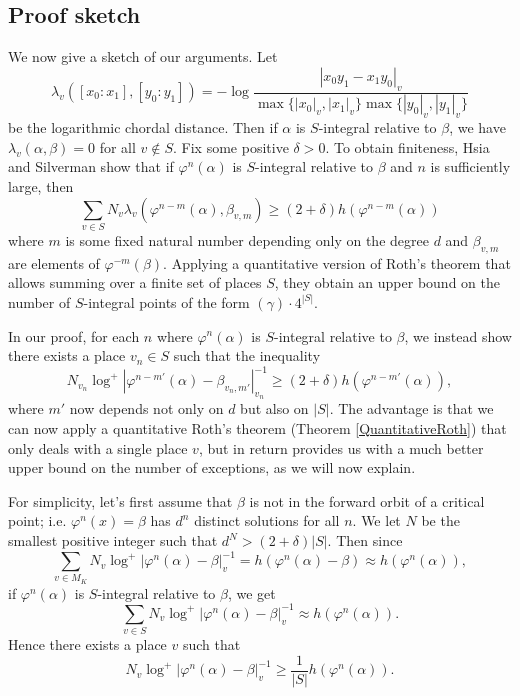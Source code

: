 \documentclass[10pt, reqno]{amsart}
\newcommand{\vphi}{\varphi}
\numberwithin{theorem}{section}
\numberwithin{equation}{section}
\numberwithin{example}{section}
\numberwithin{definition}{section}
\begin{document}
\subsection{Proof sketch}
We now give a sketch of our arguments. Let   
$$\lambda_v([x_0:x_1],[y_0:y_1]) = -\log\frac{|x_0y_1 - x_1y_0|_v}{\max\{|x_0|_v,|x_1|_v\} \max\{|y_0|_v,|y_1|_v\}}$$
be the logarithmic chordal distance. Then if $\alpha$ is $S$-integral relative to $\beta$, we have $\lambda_v(\alpha,\beta) = 0$
for all $v \not \in S$. Fix some positive $\delta > 0$. To obtain finiteness, Hsia and Silverman show that if $\vphi^n(\alpha)$ is $S$-integral relative to $\beta$ and $n$ is sufficiently large, then
$$\sum_{v \in S} N_v \lambda_v(\vphi^{n-m}(\alpha),\beta_{v,m}) \geq (2+\delta) h(\vphi^{n-m}(\alpha))$$
where $m$ is some fixed natural number depending only on the degree $d$ and $\beta_{v,m}$ are elements of $\vphi^{-m}(\beta)$. Applying a quantitative version of Roth's theorem \cite[Theorem 10]{HS11} that allows summing over a finite set of places $S$, they obtain an upper bound on the number of $S$-integral points of the form $(\gamma) \cdot 4^{|S|}$.
\par 
In our proof, for each $n$ where $\vphi^n(\alpha)$ is $S$-integral relative to $\beta$, we instead show there exists a place $v_n \in S$ such that the inequality
$$N_{v_n} \log^+|\vphi^{n-m'}(\alpha)-\beta_{v_n,m'}|^{-1}_{v_n} \geq (2+\delta)h(\vphi^{n-m'}(\alpha)),$$
where $m'$ now depends not only on $d$ but also on $|S|$. The advantage is that we can now apply a quantitative Roth's theorem (Theorem \ref{QuantitativeRoth}) that only deals with a single place $v$, but in return provides us with a much better upper bound on the number of exceptions, as we will now explain.  
\par 
For simplicity, let's first assume that $\beta$ is not in the forward orbit of a critical point; i.e. $\vphi^n(x) = \beta$ has $d^n$ distinct solutions for all $n$. We let $N$ be the smallest positive integer such that $d^N > (2+\delta)|S|$. Then since 
$$\sum_{v \in M_K} N_v \log^+|\vphi^n(\alpha) - \beta|^{-1}_v = h(\vphi^n(\alpha) - \beta) \approx h(\vphi^n(\alpha)),$$
if $\vphi^n(\alpha)$ is $S$-integral relative to $\beta$, we get
$$\sum_{v \in S} N_v \log^+|\vphi^n(\alpha) -\beta|^{-1}_v \approx h(\vphi^n(\alpha)).$$
Hence there exists a place $v$ such that
\begin{equation} \label{eq: IntroInequality1}
N_v \log^+|\vphi^n(\alpha) - \beta|_v^{-1} \geq \frac{1}{|S|} h(\vphi^n(\alpha)).
\end{equation}
\end{document}
